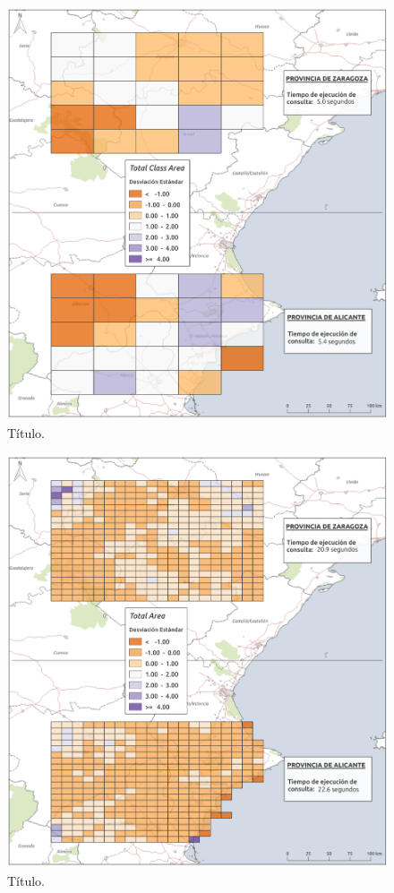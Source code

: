 \begin{figure}
\begin{center}
\includegraphics[width=\textwidth]{ResultadosyDiscusion/Figs/Results/c_100.png}
\caption{Título. \label{fig:c_100}}
\end{center}
\end{figure}

\begin{figure}
\begin{center}
\includegraphics[width=\textwidth]{ResultadosyDiscusion/Figs/Results/l_25.png}
\caption{Título. \label{fig:l_25}}
\end{center}
\end{figure}

